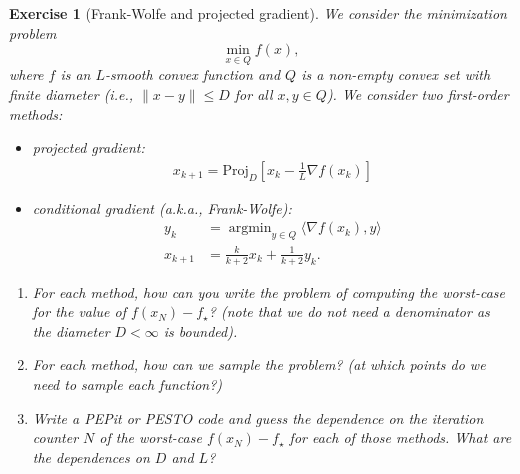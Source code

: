 \documentclass[11pt,a4paper]{article}
\newcommand{\inner}[2]{{\langle #1, #2\rangle}}
\DeclareMathOperator*{\argmin}{argmin}
\newcommand{\pesto}{{PESTO }}
\newcommand{\pepit}{{PEPit }}
\newtheorem{exercise}{Exercise}
\begin{document}
	\begin{exercise}[Frank-Wolfe and projected gradient]\label{ex:FW}
	We consider the minimization problem
	\[ \min_{x\in Q} f(x), \]
	where $f$ is an $L$-smooth convex function and $Q$ is a non-empty convex set with finite diameter (i.e., $\|x-y\|\leqslant D$ for all $x,y\in Q$). We consider two first-order methods:
	\begin{itemize}
	\item projected gradient:
	\begin{equation*}
	\begin{aligned}
	x_{k+1}=\mathrm{Proj}_D\left[x_{k}-\tfrac{1}{L}\nabla f(x_k)\right]
	\end{aligned}
	\end{equation*}
	\item conditional gradient (a.k.a., Frank-Wolfe):
	\begin{equation*}
	\begin{aligned}
	y_k &= \argmin_{y\in Q} \inner{\nabla f(x_k)}{y}\\
	x_{k+1} &= \tfrac{k}{k+2} x_k + \tfrac{1}{k+2} y_k.
	\end{aligned}
	\end{equation*}
	\end{itemize}
	
	\begin{enumerate}
	\item For each method, how can you write the problem of computing the worst-case for the value of $f(x_N)-f_\star$? (note that we do not need a denominator as the diameter $D<\infty$ is bounded).
	\item For each method, how can we sample the problem? (at which points do we need to sample each function?)
	\item Write a \pepit or \pesto code and guess the dependence on the iteration counter $N$ of the worst-case $f(x_N)-f_\star$ for each of those methods. What are the dependences on $D$ and $L$?
	\end{enumerate}
	\end{exercise}	

	
\end{document}
